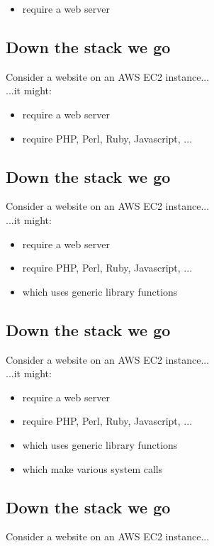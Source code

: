\documentclass[xga]{xdvislides}
\begin{document}
\begin{itemize}
	\item require a web server
\end{itemize}


\subsection{Down the stack we go}
Consider a website on an AWS EC2 instance...
\\

...it might:

\begin{itemize}
	\item require a web server
	\item require PHP, Perl, Ruby, Javascript, ...
\end{itemize}

\subsection{Down the stack we go}
Consider a website on an AWS EC2 instance...
\\

...it might:

\begin{itemize}
	\item require a web server
	\item require PHP, Perl, Ruby, Javascript, ...
	\item which uses generic library functions
\end{itemize}

\subsection{Down the stack we go}
Consider a website on an AWS EC2 instance...
\\

...it might:

\begin{itemize}
	\item require a web server
	\item require PHP, Perl, Ruby, Javascript, ...
	\item which uses generic library functions
	\item which make various system calls
\end{itemize}

\subsection{Down the stack we go}
Consider a website on an AWS EC2 instance...
\\
\end{document}
